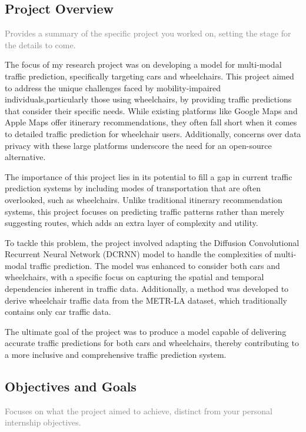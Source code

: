 \subsection{Project Overview}\label{subsec:project-overview}
\textcolor{gray}
{Provides a summary of the specific project you worked on, setting the stage for the details to come.
}

The focus of my research project was on developing a model for multi-modal traffic prediction, specifically targeting
cars and wheelchairs.
This project aimed to address the unique challenges faced by mobility-impaired individuals,particularly those using
wheelchairs, by providing traffic predictions that consider their specific needs.
While existing platforms like Google Maps and Apple Maps offer itinerary recommendations, they often fall short when it
comes to detailed traffic prediction for wheelchair users.
Additionally, concerns over data privacy with these large platforms underscore the need for an open-source alternative.

The importance of this project lies in its potential to fill a gap in current traffic prediction systems by including
modes of transportation that are often overlooked, such as wheelchairs.
Unlike traditional itinerary recommendation systems, this project focuses on predicting traffic patterns rather than
merely suggesting routes, which adds an extra
layer of complexity and utility.

To tackle this problem, the project involved adapting the Diffusion Convolutional Recurrent Neural Network (DCRNN) model
to handle the complexities of multi-modal traffic prediction.
The model was enhanced to consider both cars and wheelchairs, with a specific focus on capturing the spatial and
temporal dependencies inherent in traffic data.
Additionally, a method was developed to derive wheelchair traffic data from the METR-LA dataset, which traditionally
contains only car traffic data.

The ultimate goal of the project was to produce a model capable of delivering accurate traffic predictions for both cars
and wheelchairs, thereby contributing to a more inclusive and comprehensive traffic prediction system.

\subsection{Objectives and Goals}\label{subsec:objectives-and-goals}
\textcolor{gray}
{Focuses on what the project aimed to achieve, distinct from your personal internship objectives.
}

